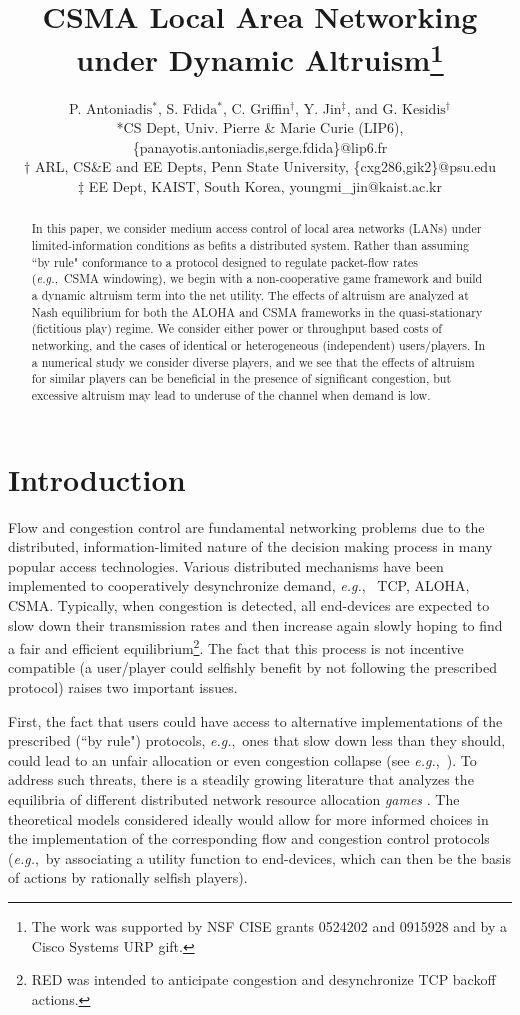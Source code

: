 \documentclass[12pt,onecolumn,draftcls]{IEEEtran}
\title{CSMA Local Area Networking\\ under Dynamic Altruism\thanks{The work 
was supported by NSF CISE grants 0524202 and 0915928
and by a Cisco Systems URP gift.}
}
\author{
P. Antoniadi$\mbox{s}^*$, S. Fdid$\mbox{a}^*$, 
C. Griffi$\mbox{n}^\dagger$, Y. Ji$\mbox{n}^\ddagger$, and 
G. Kesidi$\mbox{s}^\dagger$\\
*CS Dept, Univ. Pierre \& Marie Curie (LIP6), 
\{panayotis.antoniadis,serge.fdida\}@lip6.fr \\
$\dagger$ ARL, CS\&E and EE Depts, Penn State University, 
\{cxg286,gik2\}@psu.edu   \\
$\ddagger$  EE Dept, KAIST, South Korea, youngmi\_jin@kaist.ac.kr
}
\newcommand{\eg}{{\em e.g.},~}
\begin{document}
\maketitle

\begin{abstract}
In this paper, we consider medium access control of local area networks
(LANs) under limited-information conditions as befits a distributed system.
Rather than assuming ``by rule" conformance to a protocol designed to
regulate packet-flow rates (\eg CSMA windowing), we begin with a
non-cooperative game framework and build a dynamic altruism term into the
net utility. The effects of altruism are analyzed at Nash equilibrium for
both the ALOHA and CSMA frameworks in the quasi-stationary (fictitious
play) regime. We consider either power or throughput based costs of
networking, and the cases of identical or heterogeneous (independent)
users/players. 
In a numerical study we consider diverse players, 
and we see that the effects of altruism for similar players can be
beneficial in the presence of significant congestion, but excessive
altruism may lead to underuse of the channel when demand is low.
\end{abstract}

\section{Introduction}

Flow and congestion control are fundamental networking problems due to the
distributed, information-limited nature of the decision making process in
many popular access technologies. Various distributed 
mechanisms have been implemented to cooperatively desynchronize demand, \eg
TCP, ALOHA, CSMA.  Typically, when congestion is detected, all end-devices
are expected to slow down their transmission rates and then increase again
slowly hoping to find a fair and efficient equilibrium\footnote{RED 
\cite{Lyles99} was intended to anticipate congestion and desynchronize 
TCP backoff actions.}.
The fact that this process is not incentive compatible (a user/player 
could selfishly benefit by not
following the prescribed protocol) raises two important issues. 

First, the fact that users could have access to alternative implementations
of the prescribed (``by rule") protocols, \eg ones that slow down less than
they should, could lead to an unfair allocation or even congestion
collapse (see \eg  \cite{Cagalj05, Raya06}).  To address such threats,
there is a steadily growing literature that analyzes the equilibria of
different distributed network resource allocation {\em games}
\cite{Yaiche00, Jin02b, Basar02, Wicker03, Jin05, Cagalj05, Chiang06,
Lee07, Long07, Jin07, Cui08, Ma09}.  The theoretical models considered
ideally would allow for more informed choices in the implementation of the
corresponding flow and
congestion control protocols (\eg by associating a utility
function to end-devices, which can then be the basis of actions by
rationally selfish players). 
\end{document}
